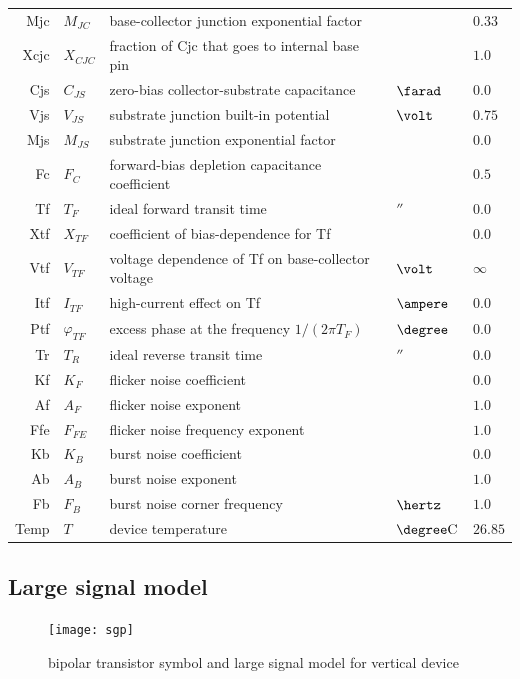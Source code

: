 \documentclass[10pt]{report}
\begin{document}
\begin{tabular}{rllll}
Mjc & $M_{JC}$ & base-collector junction exponential factor & & $0.33$\\
Xcjc & $X_{CJC}$ & fraction of Cjc that goes to internal base pin & & $1.0$\\
Cjs & $C_{JS}$ & zero-bias collector-substrate capacitance & $\farad$ & $0.0$\\
Vjs & $V_{JS}$ & substrate junction built-in potential & $\volt$ & $0.75$\\
Mjs & $M_{JS}$ & substrate junction exponential factor & & $0.0$\\
Fc & $F_C$ & forward-bias depletion capacitance coefficient & & $0.5$\\
Tf & $T_F$ & ideal forward transit time & $\second$ & $0.0$\\
Xtf & $X_{TF}$ & coefficient of bias-dependence for Tf & & $0.0$\\
Vtf & $V_{TF}$ & voltage dependence of Tf on base-collector voltage & $\volt$ & $\infty$\\
Itf & $I_{TF}$ & high-current effect on Tf & $\ampere$ & $0.0$\\
Ptf & $\varphi_{TF}$ & excess phase at the frequency $1/(2\pi T_F)$ & $\degree$ & $0.0$\\
Tr & $T_R$ & ideal reverse transit time & $\second$ & $0.0$\\
Kf & $K_F$ & flicker noise coefficient & & $0.0$\\
Af & $A_F$ & flicker noise exponent & & $1.0$\\
Ffe & $F_{FE}$ & flicker noise frequency exponent & & $1.0$\\
Kb & $K_B$ & burst noise coefficient & & $0.0$\\
Ab & $A_B$ & burst noise exponent & & $1.0$\\
Fb & $F_B$ & burst noise corner frequency & $\hertz$ & $1.0$\\
Temp & $T$ & device temperature & $\degree \mathrm{C}$ & $26.85$
\end{tabular}

\subsection{Large signal model}

\begin{figure}[ht]
\begin{center}
\texttt{[image: sgp]}
\end{center}
\caption{bipolar transistor symbol and large signal model for vertical device}
\label{fig:bjt}
\end{figure}
\FloatBarrier
\end{document}
